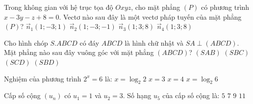 \begin{ex}%
    Trong không gian với hệ trục tọa độ $Oxyz$, cho mặt phẳng $(P)$ có phương trình $x - 3y - z + 8 = 0$. Vectơ nào sau đây là một vectơ pháp tuyến của mặt phẳng $(P)$?
    \choice
    {$\overrightarrow{n}_1(1;-3;1)$}
    {\True $\overrightarrow{n}_2(1;-3;-1)$}
    {$\overrightarrow{n}_3(1;3;8)$}
    {$\overrightarrow{n}_4(1;3;8)$}
\end{ex}

\begin{ex}%
    Cho hình chóp $S.ABCD$ có đáy $ABCD$ là hình chữ nhật và $SA \perp (ABCD)$. Mặt phẳng nào sau đây vuông góc với mặt phẳng $(ABCD)$?
    \choice
    {\True $(SAB)$}
    {$(SBC)$}
    {$(SCD)$}
    {$(SBD)$}
\end{ex}

\begin{ex}%
    Nghiệm của phương trình $2^x = 6$ là:
    \choice
    {$x = \log_2 2$}
    {$x = 3$}
    {$x = 4$}
    {\True $x = \log_2 6$}
\end{ex}

\begin{ex}%
    Cấp số cộng $(u_n)$ có $u_1 = 1$ và $u_2 = 3$. Số hạng $u_5$ của cấp số cộng là:
    \choice
    {$5$}
    {$7$}
    {\True $9$}
    {$11$}
\end{ex}

